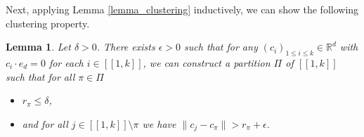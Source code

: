 \documentclass[a4paper, 11pt]{article}
\theoremstyle{plain}
\newtheorem{Lemma}[Theorem]{Lemma}
\theoremstyle{definition}
\newcommand{\R}{\mathbb{R}}
\newcommand{\range}[2]{[\![#1,#2]\!]}
\numberwithin{equation}{section}
\begin{document}
Next, applying Lemma \ref{lemma_clustering} inductively, we can show the following clustering property.


\begin{Lemma}
    \label{lemma_eps_delta_grouping}
    Let $\delta>0$. There exists $\epsilon>0$ such that for any $(c_i)_{1\leq i\leq k}\in\R^d$ with $c_i\cdot e_d=0$ for each $i\in\range{1}{k}$, we can construct a partition $\Pi$ of $\range{1}{k}$ such that for all $\pi\in\Pi$
        \begin{itemize}
            \item $r_\pi\leq\delta$,
            \item and for all $j\in\range{1}{k}\setminus\pi$ we have $\|c_j-c_\pi\|>r_\pi+\epsilon$.
        \end{itemize}
\end{Lemma}

\end{document}
